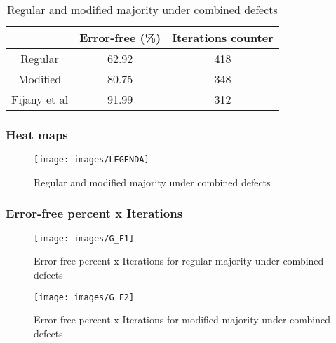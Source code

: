 \begin{table}[h]
\begin{center}
\begin{tabular}{|c|c|c|}
\hline
 & Error-free (\%) & Iterations counter \\
\hline
 Regular & 62.92 & 418 \\
\hline
 Modified & 80.75 & 348 \\
\hline
 Fijany et al & 91.99 & 312 \\
\hline

\end{tabular}
\caption{Regular and modified majority under combined defects}
\end{center}
\end{table}

\pagebreak
\subsubsection{Heat maps}

\begin{figure}[h]
\center
{}
\hfill
{}
\linebreak
\hfill
{}
\linebreak
{\texttt{[image: images/LEGENDA]}
}
\caption{Regular and modified majority under combined defects}
\label{figure:majority_t1}
\end{figure}

\pagebreak
\subsubsection{Error-free percent x Iterations}

\begin{figure}[h!]
\center
\texttt{[image: images/G\_F1]}
\caption{Error-free percent x Iterations for regular majority under combined defects}
\label{figure:majority_reg_gt1}
\end{figure}

\begin{figure}[h!]
\center
\texttt{[image: images/G\_F2]}
\caption{Error-free percent x Iterations for modified majority under combined defects}
\label{figure:majority_mod_gt1}
\end{figure}

